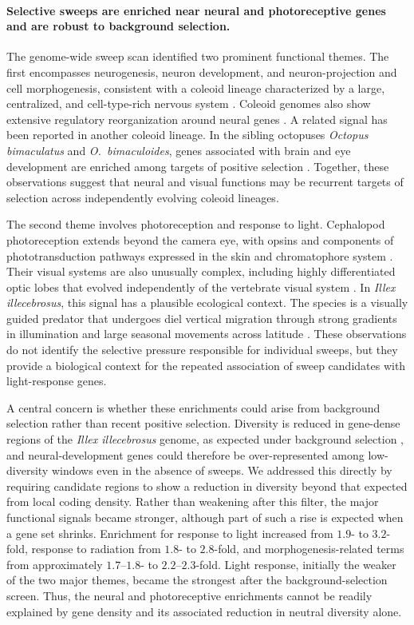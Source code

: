 \documentclass[11pt]{article}
\newcommand{\illex}{\textit{Illex illecebrosus}}
\begin{document}
\paragraph{Selective sweeps are enriched near neural and photoreceptive genes and are robust to background selection.}
The genome-wide sweep scan identified two prominent functional themes. The first encompasses neurogenesis, neuron development, and neuron-projection and cell morphogenesis, consistent with a coleoid lineage characterized by a large, centralized, and cell-type-rich nervous system \citep{albertin2015,styfhals2022}. Coleoid genomes also show extensive regulatory reorganization around neural genes \citep{schmidbaur2022}. A related signal has been reported in another coleoid lineage. In the sibling octopuses \textit{Octopus bimaculatus} and \textit{O.\ bimaculoides}, genes associated with brain and eye development are enriched among targets of positive selection \citep{coffing2026}. Together, these observations suggest that neural and visual functions may be recurrent targets of selection across independently evolving coleoid lineages.

The second theme involves photoreception and response to light. Cephalopod photoreception extends beyond the camera eye, with opsins and components of phototransduction pathways expressed in the skin and chromatophore system \citep{ramirez2015,kingston2015}. Their visual systems are also unusually complex, including highly differentiated optic lobes that evolved independently of the vertebrate visual system \citep{songcocasey2022,styfhals2022,yoshida2015}. In \illex{}, this signal has a plausible ecological context. The species is a visually guided predator that undergoes diel vertical migration through strong gradients in illumination and large seasonal movements across latitude \citep{odor1998}. These observations do not identify the selective pressure responsible for individual sweeps, but they provide a biological context for the repeated association of sweep candidates with light-response genes.

A central concern is whether these enrichments could arise from background selection rather than recent positive selection. Diversity is reduced in gene-dense regions of the \illex{} genome, as expected under background selection \citep{charlesworth1993,mcvicker2009,charlesworth2021}, and neural-development genes could therefore be over-represented among low-diversity windows even in the absence of sweeps. We addressed this directly by requiring candidate regions to show a reduction in diversity beyond that expected from local coding density. Rather than weakening after this filter, the major functional signals became stronger, although part of such a rise is expected when a gene set shrinks. Enrichment for response to light increased from $1.9$- to $3.2$-fold, response to radiation from $1.8$- to $2.8$-fold, and morphogenesis-related terms from approximately $1.7$--$1.8$- to $2.2$--$2.3$-fold. Light response, initially the weaker of the two major themes, became the strongest after the background-selection screen. Thus, the neural and photoreceptive enrichments cannot be readily explained by gene density and its associated reduction in neutral diversity alone.
\end{document}
